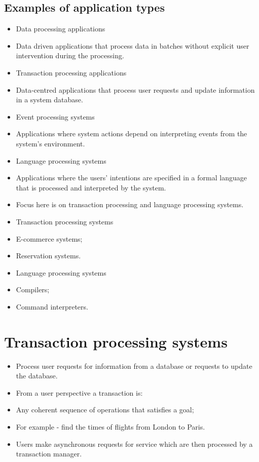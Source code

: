 \subsection{Examples of application types}
\begin{itemize}
\item Data processing applications

 \item Data driven applications that process data in batches without explicit user intervention during the processing.

\item Transaction processing applications

 \item Data-centred applications that process user requests and update information in a system database.

\item Event processing systems

 \item Applications where system actions depend on interpreting events from the system’s environment.

\item Language processing systems

 \item Applications where the users’ intentions are specified in a formal language that is processed and interpreted by the system.

\item Focus here is on transaction processing and language processing systems.

\item Transaction processing systems
\item E-commerce systems;
\item Reservation systems.
\item Language processing systems
\item Compilers;
 \item Command interpreters.


\end{itemize}
\section{Transaction processing systems}
\begin{itemize}
\item Process user requests for information from a database or requests to update the database.

\item From a user perspective a transaction is:

 \item Any coherent sequence of operations that satisfies a goal;  \item For example - find the times of flights from London to Paris.
\item Users make asynchronous requests for service which are then processed by a transaction manager.


\end{itemize}
